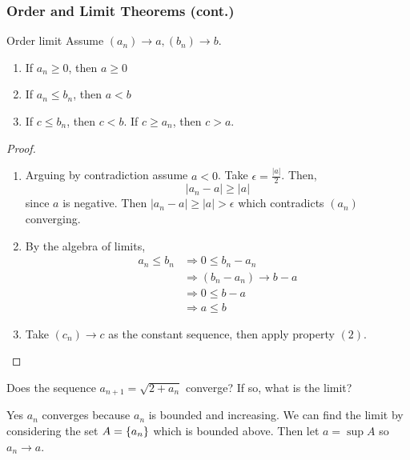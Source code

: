 \subsubsection{Order and Limit Theorems (cont.)}
\begin{thm}{Order limit}{}
    Assume $(a_n) \to a, (b_n) \to b$. 
    \begin{enumerate}
        \item If $a_n \geq 0$, then $a \geq 0$
        \item If $a_n \leq b_n$, then $a < b$
        \item If $c \leq b_n$, then $c < b$. If $c \geq a_n$, then $c > a$.
    \end{enumerate} 

    \begin{proof} 
        \begin{enumerate}
            \item Arguing by contradiction assume $a < 0$. Take $\epsilon = \frac{|a|}{2}$. Then,
            \[
                |a_n - a| \geq |a| 
            \]
            since $a$ is negative. Then $|a_n - a| \geq |a| > \epsilon$ which contradicts $(a_n)$ converging.
            \item By the algebra of limits, 
            \begin{align*}
                a_n \leq b_n &\Rightarrow 0 \leq b_n - a_n \\
                &\Rightarrow (b_n - a_n) \to b - a \\
                &\Rightarrow 0 \leq b - a \tag{By property $(1)$}\\
                &\Rightarrow a \leq b
            \end{align*}
            \item Take $(c_n) \to c$ as the constant sequence, then apply property $(2)$.
        \end{enumerate}
    \end{proof}
\end{thm}

\begin{example}{}{}
    Does the sequence $a_{n+1} = \sqrt{2 + a_n}$ converge? If so, what is the limit?
    \begin{solution}
        Yes $a_n$ converges because $a_n$ is bounded and increasing. We can find the limit by considering the set $A = \left\{a_n \right\}$ which is bounded above. Then let $a = \sup A$ so $a_n \to a$.
    \end{solution}
\end{example}

